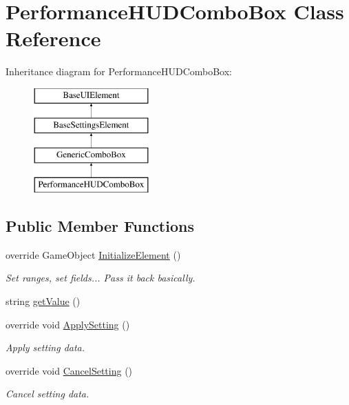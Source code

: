 \hypertarget{class_performance_h_u_d_combo_box}{}\section{Performance\+H\+U\+D\+Combo\+Box Class Reference}
\label{class_performance_h_u_d_combo_box}
Inheritance diagram for Performance\+H\+U\+D\+Combo\+Box\+:\begin{figure}[H]
\begin{center}
\leavevmode
\includegraphics[height=4.000000cm]{class_performance_h_u_d_combo_box}
\end{center}
\end{figure}
\subsection*{Public Member Functions}
\begin{DoxyCompactItemize}
\item 
override Game\+Object \hyperlink{class_performance_h_u_d_combo_box_a4d2e3c3bb7815cb0274a0d890af92cd0}{Initialize\+Element} ()
\begin{DoxyCompactList}\small\item\em Set ranges, set fields... Pass it back basically. \end{DoxyCompactList}\item 
string \hyperlink{class_performance_h_u_d_combo_box_a8441911f9ae0d92799a2f0f2089ea85c}{get\+Value} ()
\item 
override void \hyperlink{class_performance_h_u_d_combo_box_a80ec71a44640dad18ea4da16ecb39fb7}{Apply\+Setting} ()
\begin{DoxyCompactList}\small\item\em Apply setting data. \end{DoxyCompactList}\item 
override void \hyperlink{class_performance_h_u_d_combo_box_a29adb8a1a56ad279f6a87e4efc1ea5e0}{Cancel\+Setting} ()
\begin{DoxyCompactList}\small\item\em Cancel setting data. \end{DoxyCompactList}\end{DoxyCompactItemize}
